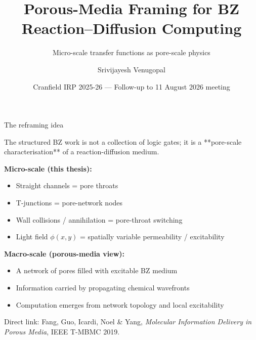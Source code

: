 \documentclass[aspectratio=169,11pt]{beamer}
\title{Porous-Media Framing for BZ Reaction--Diffusion Computing}
\subtitle{Micro-scale transfer functions as pore-scale physics}
\author{Srivijayesh Venugopal}
\date{Cranfield IRP 2025-26 --- Follow-up to 11 August 2026 meeting}
\begin{document}
\begin{frame}
\titlepage
\end{frame}

\begin{frame}{The reframing idea}

The structured BZ work is not a collection of logic gates; it is a **pore-scale characterisation** of a reaction-diffusion medium.

\vspace{0.4cm}
\textbf{Micro-scale (this thesis):}
\begin{itemize}
    \item Straight channels = pore throats
    \item T-junctions = pore-network nodes
    \item Wall collisions / annihilation = pore-throat switching
    \item Light field $\phi(x,y)$ = spatially variable permeability / excitability
\end{itemize}

\vspace{0.3cm}
\textbf{Macro-scale (porous-media view):}
\begin{itemize}
    \item A network of pores filled with excitable BZ medium
    \item Information carried by propagating chemical wavefronts
    \item Computation emerges from network topology and local excitability
\end{itemize}

\vspace{0.2cm}
{\small Direct link: Fang, Guo, Icardi, Noel \& Yang, \textit{Molecular Information Delivery in Porous Media}, IEEE T-MBMC 2019.}

\end{frame}
\end{document}
